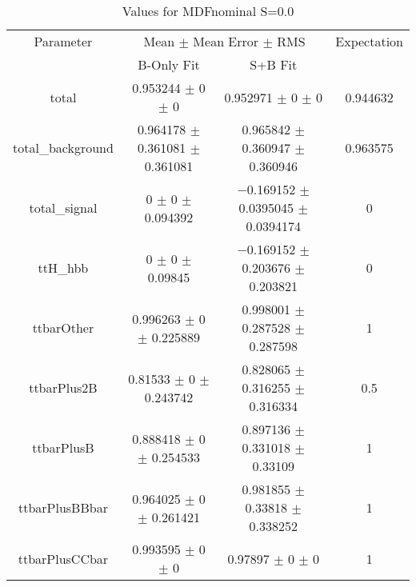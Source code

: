 \begin{table}
\centering
\caption{Values for MDFnominal S=0.0}
\begin{tabular}{cccc}
\toprule
Parameter & \multicolumn{2}{c}{Mean $\pm$ Mean Error $\pm$ RMS} & Expectation\\
 & B-Only Fit & S+B Fit & \\
\midrule
total & \num{0.953244} $\pm$ \num{0} $\pm$ \num{0} & \num{0.952971} $\pm$ \num{0} $\pm$ \num{0} & \num{0.944632}\\
total\_background & \num{0.964178} $\pm$ \num{0.361081} $\pm$ \num{0.361081} & \num{0.965842} $\pm$ \num{0.360947} $\pm$ \num{0.360946} & \num{0.963575}\\
total\_signal & \num{0} $\pm$ \num{0} $\pm$ \num{0.094392} & \num{-0.169152} $\pm$ \num{0.0395045} $\pm$ \num{0.0394174} & \num{0}\\
ttH\_hbb & \num{0} $\pm$ \num{0} $\pm$ \num{0.09845} & \num{-0.169152} $\pm$ \num{0.203676} $\pm$ \num{0.203821} & \num{0}\\
ttbarOther & \num{0.996263} $\pm$ \num{0} $\pm$ \num{0.225889} & \num{0.998001} $\pm$ \num{0.287528} $\pm$ \num{0.287598} & \num{1}\\
ttbarPlus2B & \num{0.81533} $\pm$ \num{0} $\pm$ \num{0.243742} & \num{0.828065} $\pm$ \num{0.316255} $\pm$ \num{0.316334} & \num{0.5}\\
ttbarPlusB & \num{0.888418} $\pm$ \num{0} $\pm$ \num{0.254533} & \num{0.897136} $\pm$ \num{0.331018} $\pm$ \num{0.33109} & \num{1}\\
ttbarPlusBBbar & \num{0.964025} $\pm$ \num{0} $\pm$ \num{0.261421} & \num{0.981855} $\pm$ \num{0.33818} $\pm$ \num{0.338252} & \num{1}\\
ttbarPlusCCbar & \num{0.993595} $\pm$ \num{0} $\pm$ \num{0} & \num{0.97897} $\pm$ \num{0} $\pm$ \num{0} & \num{1}\\
\bottomrule
\end{tabular}
\end{table}